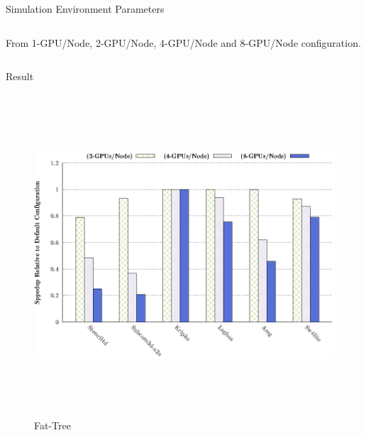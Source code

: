\documentclass[final]{beamer}
\newlength{\sepwidth}
\newcommand{\separatorcolumn}{\begin{column}{\sepwidth}\end{column}}
\begin{document}
\begin{frame}[t]
\begin{columns}[t]
\begin{column}{0.5\textwidth}
\begin{block}{Simulation Environment Parameters}
\begin{column}{0.3\textwidth}
\vspace{2cm}
From 1-GPU/Node, 2-GPU/Node, 4-GPU/Node and 8-GPU/Node configuration.

  \end{column}

  \end{block}


\vspace{-2cm}

  \begin{block}{Result}
 \begin{figure}
\centering
\begin{minipage}[t][2cm][t]{.45\textwidth}
\centering
\includegraphics[width=1\linewidth,height=12cm]{figs/ftree-x-mapping-all.eps}
\caption{Fat-Tree}
\label{fig:13a}
\end{minipage}
\separatorcolumn
\begin{minipage}[t][2cm][t]{.45\textwidth}
\centering

\end{minipage}
\end{figure}
\end{block}
\end{column}
\end{columns}
\end{frame}
\end{document}
